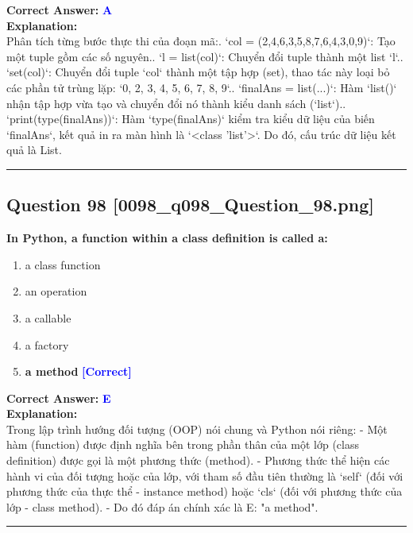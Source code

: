 \documentclass[11pt,a4paper]{article}
\begin{document}
\begin{minipage}{\textwidth}
\noindent \textbf{Correct Answer:} \textcolor{blue}{\textbf{A}} \\[4pt]
\noindent \textbf{Explanation:}\\
Phân tích từng bước thực thi của đoạn mã:. `col = (2,4,6,3,5,8,7,6,4,3,0,9)`: Tạo một tuple gồm các số nguyên.. `l = list(col)`: Chuyển đổi tuple thành một list `l`.. `set(col)`: Chuyển đổi tuple `col` thành một tập hợp (set), thao tác này loại bỏ các phần tử trùng lặp: `{0, 2, 3, 4, 5, 6, 7, 8, 9}`.. `finalAns = list(...)`: Hàm `list()` nhận tập hợp vừa tạo và chuyển đổi nó thành kiểu danh sách (`list`).. `print(type(finalAns))`: Hàm `type(finalAns)` kiểm tra kiểu dữ liệu của biến `finalAns`, kết quả in ra màn hình là `<class 'list'>`.\newline
Do đó, cấu trúc dữ liệu kết quả là List.
\end{minipage}
\vspace{0.8cm}
\hrule
\vspace{0.5cm}

\begin{minipage}{\textwidth}
\subsection*{Question 98 \quad \footnotesize{[0098_q098_Question_98.png]}}
\noindent \textbf{In Python, a function within a class definition is called a:}

\begin{enumerate}[label=\Alph*.]
    \item a class function
    \item an operation
    \item a callable
    \item a factory
    \item \textbf{a method} \hfill \textcolor{blue}{\textbf{[Correct]}}
\end{enumerate}

\noindent \textbf{Correct Answer:} \textcolor{blue}{\textbf{E}} \\[4pt]
\noindent \textbf{Explanation:}\\
Trong lập trình hướng đối tượng (OOP) nói chung và Python nói riêng:\newline
- Một hàm (function) được định nghĩa bên trong phần thân của một lớp (class definition) được gọi là một phương thức (method).\newline
- Phương thức thể hiện các hành vi của đối tượng hoặc của lớp, với tham số đầu tiên thường là `self` (đối với phương thức của thực thể - instance method) hoặc `cls` (đối với phương thức của lớp - class method).\newline
- Do đó đáp án chính xác là E: "a method".
\end{minipage}
\vspace{0.8cm}
\hrule
\vspace{0.5cm}
\end{document}
